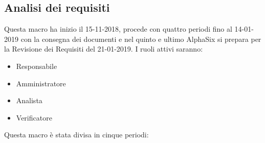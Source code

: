     \subsection{Analisi dei requisiti}
        Questa macro ha inizio il 15-11-2018, procede con quattro periodi fino al 14-01-2019 con la consegna dei documenti e nel
        quinto e ultimo AlphaSix si prepara per la Revisione dei Requisiti del 21-01-2019. I ruoli attivi saranno: 
        \begin{itemize}
            \item Responsabile
            \item Amministratore
            \item Analista
            \item Verificatore
        \end{itemize}
        Questa macro è stata divisa in cinque periodi:

